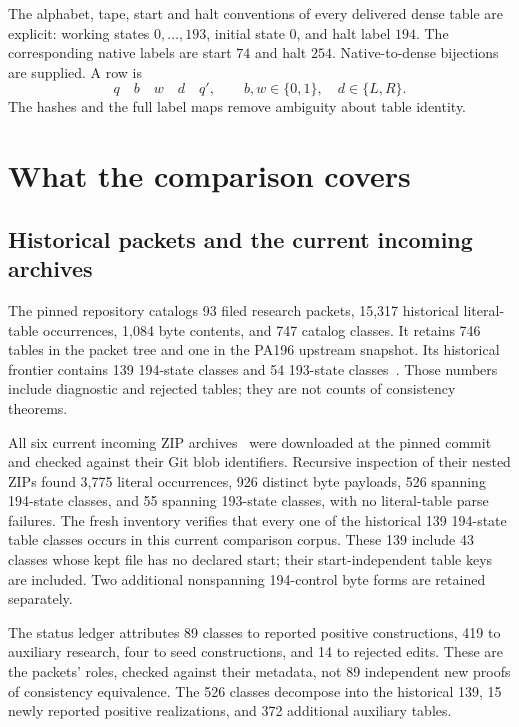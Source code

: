 \documentclass[11pt,letterpaper]{article}
\newcommand{\file}[1]{\path{#1}}
\begin{document}
The alphabet, tape, start and halt conventions of every delivered dense table are explicit: working states $0,\ldots,193$, initial state $0$, and halt label $194$. The corresponding native labels are start $74$ and halt $254$. Native-to-dense bijections are supplied. A row is
\[
  q\quad b\quad w\quad d\quad q',\qquad b,w\in\{0,1\},\quad d\in\{L,R\}.
\]
The hashes and the full label maps remove ambiguity about table identity.



\section{What the comparison covers}
\subsection{Historical packets and the current incoming archives}

The pinned repository catalogs 93 filed research packets, 15,317 historical literal-table occurrences, 1,084 byte contents, and 747 catalog classes. It retains 746 tables in the packet tree and one in the PA196 upstream snapshot. Its historical frontier contains 139 194-state classes and 54 193-state classes~\cite{catalog}. Those numbers include diagnostic and rejected tables; they are not counts of consistency theorems.

All six current incoming ZIP archives~\cite{incoming} were downloaded at the pinned commit and checked against their Git blob identifiers. Recursive inspection of their nested ZIPs found 3,775 literal \file{.tm} occurrences, 926 distinct byte payloads, 526 spanning 194-state classes, and 55 spanning 193-state classes, with no literal-table parse failures. The fresh inventory verifies that every one of the historical 139 194-state table classes occurs in this current comparison corpus. These 139 include 43 classes whose kept file has no declared start; their start-independent table keys are included. Two additional nonspanning 194-control byte forms are retained separately.

The status ledger attributes 89 classes to reported positive constructions, 419 to auxiliary research, four to seed constructions, and 14 to rejected edits. These are the packets' roles, checked against their metadata, not 89 independent new proofs of consistency equivalence. The 526 classes decompose into the historical 139, 15 newly reported positive realizations, and 372 additional auxiliary tables.
\end{document}
